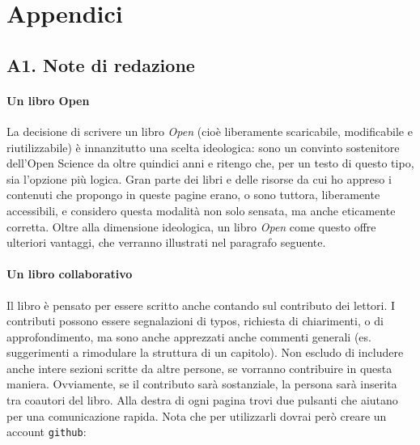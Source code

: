 \documentclass[
  italian,
  letterpaper,
  paper=6in:9in,
  pagesize=pdftex,
  headinclude=on,
  footinclude=on,
  11pt]{scrbook}
\begin{document}
\part{Appendici}

\chapter*{A1. Note di redazione}\label{note_redazione}


\subsection*{Un libro Open}\label{un-libro-open}

La decisione di scrivere un libro \emph{Open} (cioè liberamente
scaricabile, modificabile e riutilizzabile) è innanzitutto una scelta
ideologica: sono un convinto sostenitore dell'Open Science da oltre
quindici anni e ritengo che, per un testo di questo tipo, sia l'opzione
più logica. Gran parte dei libri e delle risorse da cui ho appreso i
contenuti che propongo in queste pagine erano, o sono tuttora,
liberamente accessibili, e considero questa modalità non solo sensata,
ma anche eticamente corretta. Oltre alla dimensione ideologica, un libro
\emph{Open} come questo offre ulteriori vantaggi, che verranno
illustrati nel paragrafo seguente.

\subsection*{Un libro collaborativo}\label{un-libro-collaborativo}

Il libro è pensato per essere scritto anche contando sul contributo dei
lettori. I contributi possono essere segnalazioni di typos, richiesta di
chiarimenti, o di approfondimento, ma sono anche apprezzati anche
commenti generali (es. suggerimenti a rimodulare la struttura di un
capitolo). Non escludo di includere anche intere sezioni scritte da
altre persone, se vorranno contribuire in questa maniera. Ovviamente, se
il contributo sarà sostanziale, la persona sarà inserita tra coautori
del libro. Alla destra di ogni pagina trovi due pulsanti che aiutano per
una comunicazione rapida. Nota che per utilizzarli dovrai però creare un
account \texttt{github}:
\end{document}
